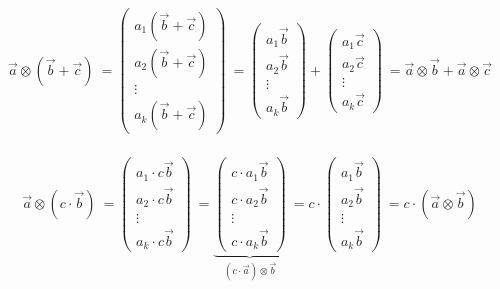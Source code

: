 \documentclass[a4paper,10pt]{hw}
\begin{document}
\subsubsection{}
$$
\vec{a} \otimes (\vec{b} + \vec{c})
\
=
\begin{pmatrix}
a_1 (\vec{b} + \vec{c}) \\ a_2 (\vec{b} + \vec{c}) \\ \vdots \\ a_k (\vec{b} + \vec{c})
\end{pmatrix}
\
=
\begin{pmatrix}
a_1 \vec{b}  \\ a_2 \vec{b} \\ \vdots \\ a_k \vec{b}
\end{pmatrix}
+
\begin{pmatrix}
a_1 \vec{c}  \\ a_2 \vec{c} \\ \vdots \\ a_k \vec{c}
\end{pmatrix}
\
=
\vec{a}\otimes\vec{b}+\vec{a}\otimes\vec{c}
$$

\subsubsection{}
$$
\vec{a}\otimes\left(c\cdot\vec{b}\right)
\
=
\begin{pmatrix}
a_1 \cdot c\vec{b}\\ a_2 \cdot c\vec{b}\\ \vdots\\ a_k\cdot c\vec{b}
\end{pmatrix}
\
=
\underbrace{
	\begin{pmatrix}
	c\cdot a_1\vec{b}\\ c\cdot a_2 \vec{b}\\ \vdots\\ c\cdot a_k\vec{b}
	\end{pmatrix}
}_{
	\left(c\cdot \vec{a}\right) \otimes \vec{b}
}
\
=
c\cdot 
\begin{pmatrix}
a_1\vec{b}\\ a_2 \vec{b}\\ \vdots\\ a_k\vec{b}
\end{pmatrix}
\
=
c\cdot\left(\vec{a}\otimes\vec{b}\right)
$$
\end{document}
